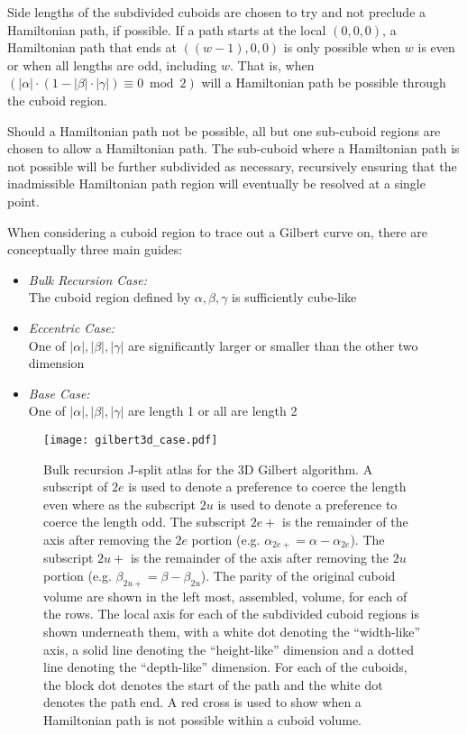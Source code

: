 Side lengths of the subdivided cuboids are chosen to try and not preclude a
Hamiltonian path, if possible.
If a path starts at the local $(0,0,0)$, a Hamiltonian path that ends
at $((w-1),0,0)$ is only possible when $w$ is even or when all lengths are odd, including $w$.
That is, when $(|\alpha| \cdot ( 1 - |\beta| \cdot |\gamma| ) \equiv 0 \bmod 2)$ will a Hamiltonian
path be possible through the cuboid region.

Should a Hamiltonian path not be possible, all but one sub-cuboid regions are chosen to allow a Hamiltonian
path.
The sub-cuboid where a Hamiltonian path is not possible will be further subdivided as necessary, recursively
ensuring that the inadmissible Hamiltonian path region will eventually be resolved at a single point.

When considering a cuboid region to trace out a Gilbert curve on, there are conceptually three main guides:

\begin{itemize}
  \item \textit{Bulk Recursion Case:} \\ The cuboid region defined by $\alpha, \beta, \gamma$ is sufficiently cube-like
  \item \textit{Eccentric Case:} \\ One of $|\alpha|, |\beta|, |\gamma|$ are significantly larger or smaller than the other two dimension
  \item \textit{Base Case:} \\ One of $|\alpha|, |\beta|, |\gamma|$ are length 1 or all are length 2
\end{itemize}


\begin{figure*}[ht]
  \centering
  \texttt{[image: gilbert3d\_case.pdf]}
  \caption{ Bulk recursion J-split atlas for the 3D Gilbert algorithm. A subscript of $2e$ is used to denote a preference
  to coerce the length even where as the subscript $2u$ is used to denote a preference to coerce the length odd.
  The subscript $2e+$ is the remainder of the axis after removing the $2e$ portion (e.g. $\alpha_{2e+} = \alpha - \alpha_{2e}$).
  The subscript $2u+$ is the remainder of the axis after removing the $2u$ portion (e.g. $\beta_{2u+} = \beta - \beta_{2u}$).
  The parity of the original cuboid volume are shown in the left most, assembled, volume, for each of the rows.
  The local axis for each of the subdivided cuboid regions is shown underneath them, with a white dot
  denoting the ``width-like'' axis, a solid line denoting the ``height-like'' dimension and a dotted line
  denoting the ``depth-like'' dimension. For each of the cuboids, the block dot denotes the start of the path
  and the white dot denotes the path end. A red cross is used to show when a Hamiltonian path is not possible within a cuboid volume.  }
  \label{fig:gilbert3DCase}
\end{figure*}



